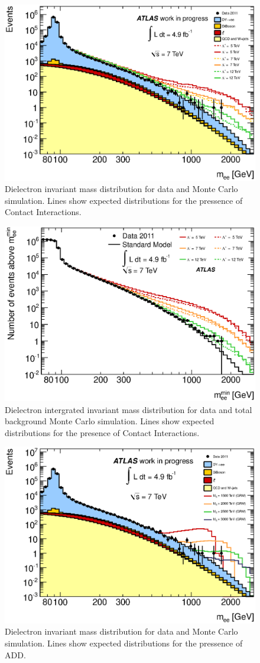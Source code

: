 \begin{figure}[h!p]
\centering
\includegraphics[width=0.7\linewidth]{images/inv_mass.eps}
\caption{Dielectron invariant mass distribution for data and Monte Carlo simulation. Lines show expected distributions for the pressence of Contact Interactions.}
\label{fig:CIinvMass}
\end{figure}

\begin{figure}[h!p]
\centering
\includegraphics[width=0.7\linewidth]{images/int_inv_mass.eps}
\caption{Dielectron intergrated invariant mass distribution for data and total background Monte Carlo simulation. Lines show expected distributions for the presence of Contact Interactions.}
\label{fig:CIintinvMass}
\end{figure}

\begin{figure}[h!p]
\centering
\includegraphics[width=0.7\linewidth]{images/ADD_inv_mass.eps}
\caption{Dielectron invariant mass distribution for data and Monte Carlo simulation. Lines show expected distributions for the pressence of ADD.}
\label{fig:ADDinvMass}
\end{figure}

